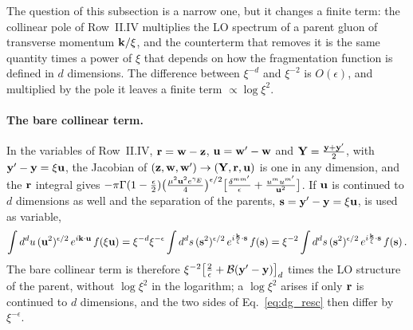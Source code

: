 The question of this subsection is a narrow one, but it changes a finite term: the collinear pole of Row~II.IV multiplies the LO spectrum of a parent gluon of transverse momentum $\mathbf{k}/\xi$, and the counterterm that removes it is the same quantity times a power of $\xi$ that depends on how the fragmentation function is defined in $d$ dimensions. The difference between $\xi^{-d}$ and $\xi^{-2}$ is $O(\epsilon)$, and multiplied by the pole it leaves a finite term $\propto\log\xi^2$.



\paragraph{The bare collinear term.} In the variables of Row~II.IV, $\mathbf{r}=\mathbf{w}-\mathbf{z}$, $\mathbf{u}=\mathbf{w}'-\mathbf{w}$ and $\mathbf{Y}=\frac{\mathbf{y}+\mathbf{y}'}{2}$, with $\mathbf{y}'-\mathbf{y}=\xi\mathbf{u}$, the Jacobian of $(\mathbf{z},\mathbf{w},\mathbf{w}')\to(\mathbf{Y},\mathbf{r},\mathbf{u})$ is one in any dimension, and the $\mathbf{r}$ integral gives $-\pi\Gamma(1-\frac\epsilon2)\big(\frac{\mu^2\mathbf{u}^2e^{\gamma_E}}{4}\big)^{\epsilon/2}\big[\frac{\delta^{mm'}}{\epsilon}+\frac{u^mu^{m'}}{\mathbf{u}^2}\big]$. If $\mathbf{u}$ is continued to $d$ dimensions as well and the separation of the parents, $\mathbf{s}=\mathbf{y}'-\mathbf{y}=\xi\mathbf{u}$, is used as variable,
\begin{align}\label{eq:dg_resc}
\int d^du\,(\mathbf{u}^2)^{\epsilon/2}\,e^{i\mathbf{k}\cdot\mathbf{u}}\,f(\xi\mathbf{u})=\xi^{-d}\xi^{-\epsilon}\int d^ds\,(\mathbf{s}^2)^{\epsilon/2}\,e^{i\frac{\mathbf{k}}{\xi}\cdot\mathbf{s}}\,f(\mathbf{s})=\xi^{-2}\int d^ds\,(\mathbf{s}^2)^{\epsilon/2}\,e^{i\frac{\mathbf{k}}{\xi}\cdot\mathbf{s}}\,f(\mathbf{s})\,.
\end{align}
The bare collinear term is therefore $\xi^{-2}\big[\frac2\epsilon+\mathcal B(\mathbf{y}'-\mathbf{y})\big]_d$ times the LO structure of the parent, without $\log\xi^2$ in the logarithm; a $\log\xi^2$ arises if only $\mathbf{r}$ is continued to $d$ dimensions, and the two sides of Eq.~\eqref{eq:dg_resc} then differ by $\xi^{-\epsilon}$.

